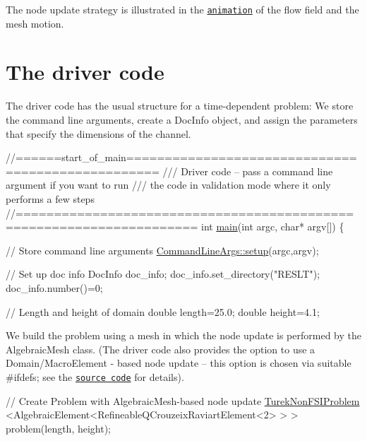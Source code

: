 The node update strategy is illustrated in the \href{../figures/turek_flag_non_fsi.avi}{\tt animation} of the flow field and the mesh motion.



 

\hypertarget{index_main}{}\section{The driver code}\label{index_main}
The driver code has the usual structure for a time-\/dependent problem\+: We store the command line arguments, create a {\ttfamily Doc\+Info} object, and assign the parameters that specify the dimensions of the channel.

 
\begin{DoxyCodeInclude}
\textcolor{comment}{//======start\_of\_main==================================================}
\textcolor{comment}{/// Driver code -- pass a command line argument if you want to run}
\textcolor{comment}{}\textcolor{comment}{/// the code in validation mode where it only performs a few steps}
\textcolor{comment}{}\textcolor{comment}{//=====================================================================}
\textcolor{keywordtype}{int} \hyperlink{turek__flag__non__fsi_8cc_a0ddf1224851353fc92bfbff6f499fa97}{main}(\textcolor{keywordtype}{int} argc, \textcolor{keywordtype}{char}* argv[])
\{

 \textcolor{comment}{// Store command line arguments}
 \hyperlink{namespaceFlag__definition_a61a03bffd4a34950ef9892be53c49f89}{CommandLineArgs::setup}(argc,argv);
 
 \textcolor{comment}{// Set up doc info}
 DocInfo doc\_info; 
 doc\_info.set\_directory(\textcolor{stringliteral}{"RESLT"});
 doc\_info.number()=0;
 
 \textcolor{comment}{// Length and height of domain}
 \textcolor{keywordtype}{double} length=25.0;
 \textcolor{keywordtype}{double} height=4.1;

\end{DoxyCodeInclude}


We build the problem using a mesh in which the node update is performed by the {\ttfamily Algebraic\+Mesh} class. (The driver code also provides the option to use a {\ttfamily Domain/\+Macro\+Element} -\/ based node update -- this option is chosen via suitable \#ifdefs; see the \href{
../../../../demo_drivers/navier_stokes/turek_flag_non_fsi/turek_flag_non_fsi.cc
}{\tt source code} for details).


\begin{DoxyCodeInclude}
 \textcolor{comment}{// Create Problem with AlgebraicMesh-based node update}
 \hyperlink{classTurekNonFSIProblem}{TurekNonFSIProblem}
  <AlgebraicElement<RefineableQCrouzeixRaviartElement<2> > > 
  problem(length, height);

\end{DoxyCodeInclude}


